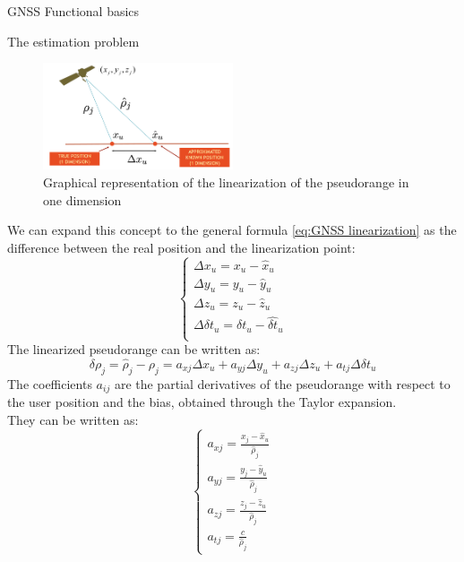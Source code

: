 \begin{section}{GNSS Functional basics}
\begin{subsection}{The estimation problem}
      \begin{figure}[h]
        \centering
        \includegraphics[width=0.5\textwidth]{img/wireless/linearization scenario.png}
        \caption{Graphical representation of the linearization of the pseudorange in one dimension}
        \label{fig:GNSS linearization}
      \end{figure}
      We can expand this concept to the general formula \ref{eq:GNSS linearization} as the difference 
      between the real position and the linearization point:
      \begin{equation}
        \begin{cases}
          \Delta x_u = x_u - \hat{x}_u\\
          \Delta y_u = y_u - \hat{y}_u\\
          \Delta z_u = z_u - \hat{z}_u\\
          \Delta \delta t_u = \delta t_u - \hat{\delta t}_u\\
        \end{cases}
        \label{eq:GNSS linearization difference}
      \end{equation}
      The linearized pseudorange can be written as:
      \begin{equation}
        \delta \rho_j = \hat{\rho}_j - \rho_j = a_{xj}\Delta x_u + a_{yj}\Delta y_u + a_{zj}\Delta z_u + a_{tj}\Delta \delta t_u
        \label{eq:GNSS linearized pseudorange}
      \end{equation}
      The coefficients $a_{ij}$ are the partial derivatives of the pseudorange with respect to the
      user position and the bias, obtained through the Taylor expansion.\\
      They can be written as:
      \begin{equation}
        \begin{cases}
          a_{xj} = \frac{x_j - \hat{x}_u}{\hat{\rho}_j}\\
          a_{yj} = \frac{y_j - \hat{y}_u}{\hat{\rho}_j}\\
          a_{zj} = \frac{z_j - \hat{z}_u}{\hat{\rho}_j}\\
          a_{tj} = \frac{c}{\hat{\rho}_j}

\end{cases}
\end{equation}
\end{subsection}
\end{section}
